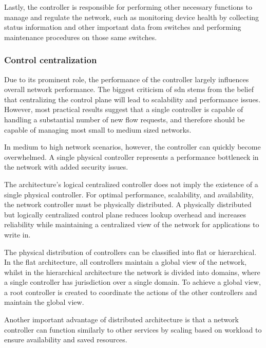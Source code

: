 Lastly, the controller is responsible for performing other necessary functions to manage and regulate the network, such as monitoring device health by collecting status information and other important data from switches and performing maintenance procedures on those same switches.

\subsubsection{Control centralization}
Due to its prominent role, the performance of the controller largely influences overall network performance. The biggest criticism of \gls{sdn} stems from the belief that centralizing the control plane will lead to scalability and performance issues. However, most practical results suggest that a single controller is capable of handling a substantial number of new flow requests, and therefore should be capable of managing most small to medium sized networks\cite{nunes_survey_2014}\cite{zhu_sdn_2020}.

In medium to high network scenarios, however, the controller can quickly become overwhelmed. A single physical controller represents a performance bottleneck in the network with added security issues\cite{zhu_sdn_2020}. 

The architecture's logical centralized controller does not imply the existence of a single physical controller. For optimal performance, scalability, and availability, the network controller must be physically distributed\cite{kreutz_software-defined_2015}. A physically distributed but logically centralized control plane reduces lookup overhead and increases reliability while maintaining a centralized view of the network for applications to write in\cite{nunes_survey_2014}. 

The physical distribution of controllers can be classified into flat or hierarchical\cite{zhu_sdn_2020}. In the flat architecture, all controllers maintain a global view of the network, whilst in the hierarchical architecture the network is divided into domains, where a single controller has jurisdiction over a single domain. To achieve a global view, a root controller is created to coordinate the actions of the other controllers and maintain the global view. 

Another important advantage of distributed architecture is that a network controller can function similarly to other services by scaling based on workload to ensure availability and saved resources\cite{peterson_software-defined_2021}. 

